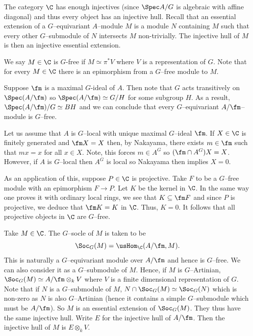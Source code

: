 \documentclass{amsart}
\begin{document}
  The category \(\C\) has enough injectives (since \(\Spec A/G\) is algebraic
  with affine diagonal) and thus every object
  has an injective hull. Recall that an essential extension
  of a \(G\)--equivariant \(A\)--module \(M\) is a module \(N\)
  containing \(M\) such that every other \(G\)--submodule of 
  \(N\) intersects \(M\) non-trivially. The injective
  hull of \(M\) is then an injective essential extension.

  \sssec{}

  We say \(M \in \C\) is \(G\)-free if \(M \simeq \pi^\ast V \)
  where \(V\) is a representation of \(G\).
  Note that for every \(M \in \C\) there
  is an epimorphism from a \(G\)--free
  module to \(M\).

  Suppose \(\fm\) is a maximal \(G\)-ideal of \(A\).
  Then note that \(G\) acts transitively on \(\Spec (A/\fm)\)
  so \(\Spec (A/\fm) \simeq G/H\) for some subgroup \(H\).
  As a result, \(\Spec (A/\fm)/G \simeq BH\)
  and we can conclude that every \(G\)--equivariant
  \(A/\fm\)--module is \(G\)--free.

  \sssec{}\label{sec:equiv_nakayama}

  Let us assume that \(A\) is \(G\)--local with unique
  maximal \(G\)--ideal \(\fm\). If \(X \in \C\)
  is finitely generated and \(\fm X = X\)
  then, by Nakayama, there exists
  \(m \in \fm\) such that \(mx = x\)
  for all \(x \in X\). Note, this
  forces \(m \in A^G\) so \((\fm \cap A^G) X = X\).
  However, if \(A\) is \(G\)--local
  then \(A^G\) is local so Nakayama
  then implies \(X = 0\).

  \sssec{}

  As an application of this, suppose \(P \in \C\)
  is projective. Take \(F\) to be a \(G\)--free
  module with an epimorphism \(F \to P\).
  Let \(K\) be the kernel in \(\C\).
  In the same way one proves it with
  ordinary local rings, we see that
  \(K \subseteq \fm F\) and since \(P\)
  is projective, we deduce
  that \(\fm K = K\) in \(\C\).
  Thus, \(K = 0\). It follows
  that all projective objects in \(\C\)
  are \(G\)--free.


  \sssec{}\label{sec:socle}

  Take \(M \in \C\). The \(G\)--socle of \(M\) is taken to be
  \begin{displaymath}
    \Soc_G(M) = \usHom_\C(A/\fm, M).
  \end{displaymath}
  This is naturally a \(G\)--equivariant module
  over \(A/\fm\) and hence is \(G\)--free.
  We can also consider it as a \(G\)--submodule of \(M\).
  Hence, if \(M\) is \(G\)--Artinian, 
  \(\Soc_G(M) \simeq A/\fm \otimes_k V\)
  where \(V\) is a finite dimensional representation
  of \(G\). Note that if \(N\) is a \(G\)--submodule of \(M\),
  \(N \cap \Soc_G(M) \simeq \Soc_G(N)\) which is
  non-zero as \(N\) is also \(G\)--Artinian
  (hence it contains a simple \(G\)--submodule which must be
  \(A/\fm\)). So \(M\) is an essential extension of \(\Soc_G(M)\).
  They thus have the same injective hull. Write
  \(E\) for the injective hull of \(A/\fm\).
  Then the injective hull of \(M\) is \(E \otimes _k V\).
\end{document}
